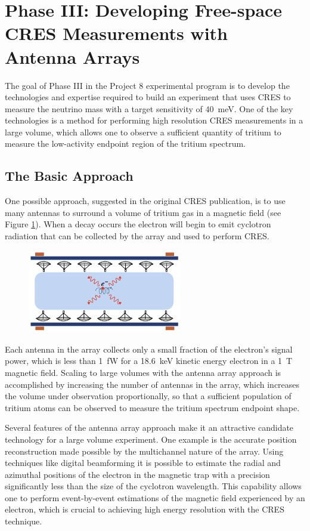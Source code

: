 \section{Phase III: Developing Free-space CRES Measurements with Antenna Arrays}

The goal of Phase III in the Project 8 experimental program is to develop the technologies and expertise required to build an experiment that uses CRES to measure the neutrino mass with a target sensitivity of 40~meV. One of the key technologies is a method for performing high resolution CRES measurements in a large volume, which allows one to observe a sufficient quantity of tritium to measure the low-activity endpoint region of the tritium spectrum. 

\subsection{The Basic Approach}

One possible approach, suggested in the original CRES publication, is to use many antennas to surround a volume of tritium gas in a magnetic field (see Figure \ref{fig:chap3-antenna-concept-cartoon}). When a decay occurs the electron will begin to emit cyclotron radiation that can be collected by the array and used to perform CRES.
\begin{figure}[htbp]
    \centering
    \includegraphics*[width=0.6\textwidth]{figs/Chapter-3/230614_antenna_cartoon.png}
    \caption{\label{fig:chap3-antenna-concept-cartoon}}
\end{figure}
Each antenna in the array collects only a small fraction of the electron's signal power, which is less than 1~fW for a 18.6~keV kinetic energy electron in a 1~T magnetic field. Scaling to large volumes with the antenna array approach is accomplished by increasing the number of antennas in the array, which increases the volume under observation proportionally, so that a sufficient population of tritium atoms can be observed to measure the tritium spectrum endpoint shape. 

Several features of the antenna array approach make it an attractive candidate technology for a large volume experiment. One example is the accurate position reconstruction made possible by the multichannel nature of the array. Using techniques like digital beamforming it is possible to estimate the radial and azimuthal positions of the electron in the magnetic trap with a precision significantly less than the size of the cyclotron wavelength. This capability allows one to perform event-by-event estimations of the magnetic field experienced by an electron, which is crucial to achieving high energy resolution with the CRES technique.

